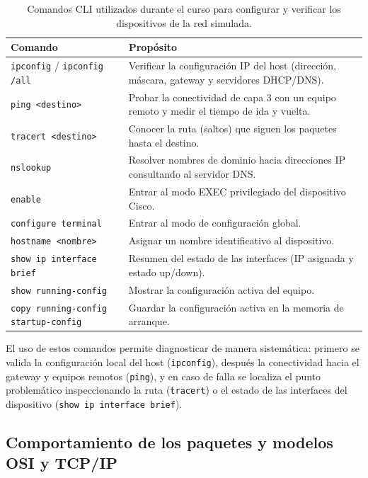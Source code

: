 \documentclass[11pt,a4paper]{article}
\begin{document}
\begin{table}[htbp]
  \centering
  \begin{tabular}{p{5.2cm}p{9.2cm}}
    \hline
    \textbf{Comando} & \textbf{Propósito} \\ \hline
    \texttt{ipconfig} / \texttt{ipconfig /all} & Verificar la configuración IP del host (dirección, máscara, gateway y servidores DHCP/DNS). \\
    \texttt{ping <destino>} & Probar la conectividad de capa 3 con un equipo remoto y medir el tiempo de ida y vuelta. \\
    \texttt{tracert <destino>} & Conocer la ruta (saltos) que siguen los paquetes hasta el destino. \\
    \texttt{nslookup} & Resolver nombres de dominio hacia direcciones IP consultando al servidor DNS. \\
    \texttt{enable} & Entrar al modo EXEC privilegiado del dispositivo Cisco. \\
    \texttt{configure terminal} & Entrar al modo de configuración global. \\
    \texttt{hostname <nombre>} & Asignar un nombre identificativo al dispositivo. \\
    \texttt{show ip interface brief} & Resumen del estado de las interfaces (IP asignada y estado up/down). \\
    \texttt{show running-config} & Mostrar la configuración activa del equipo. \\
    \texttt{copy running-config startup-config} & Guardar la configuración activa en la memoria de arranque. \\ \hline
  \end{tabular}
  \caption{Comandos CLI utilizados durante el curso para configurar y
  verificar los dispositivos de la red simulada.}
  \label{tab:cli}
\end{table}

El uso de estos comandos permite diagnosticar de manera sistemática: primero
se valida la configuración local del host (\texttt{ipconfig}), después la
conectividad hacia el gateway y equipos remotos (\texttt{ping}), y en caso de
falla se localiza el punto problemático inspeccionando la ruta
(\texttt{tracert}) o el estado de las interfaces del dispositivo
(\texttt{show ip interface brief}).

\subsection{Comportamiento de los paquetes y modelos OSI y TCP/IP}
\end{document}
